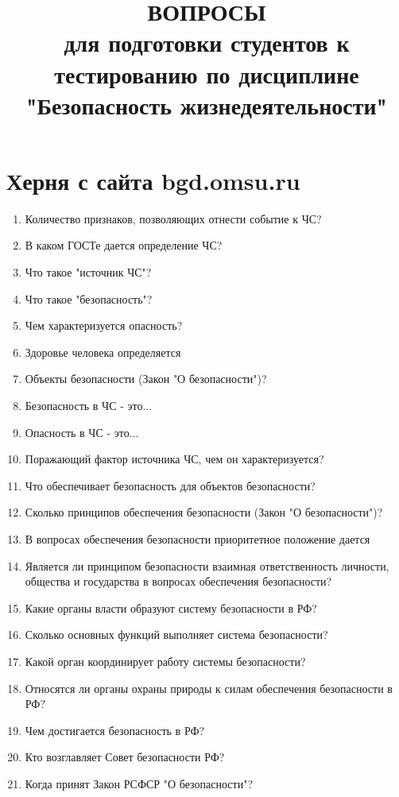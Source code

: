 \documentclass[oneside,final,14pt]{extreport}
\begin{document}
\title{ВОПРОСЫ \\
	для подготовки студентов к тестированию по дисциплине "Безопасность жизнедеятельности"}
\maketitle

\section*{Херня с сайта bgd.omsu.ru}
\begin{enumerate}
	\item Количество признаков, позволяющих отнести событие к ЧС?
	\item В каком ГОСТе дается определение ЧС?
	\item  Что такое "источник ЧС"?
	\item  Что такое "безопасность"?
	\item  Чем характеризуется опасность?
	\item  Здоровье человека определяется
	\item  Объекты безопасности (Закон "О безопасности")?
	\item  Безопасность в ЧС - это...
	\item  Опасность в ЧС - это...
	\item  Поражающий фактор источника ЧС, чем он характеризуется?
	\item  Что обеспечивает безопасность для объектов безопасности?
	\item  Сколько принципов обеспечения безопасности (Закон "О безопасности")?
	\item  В вопросах обеспечения безопасности приоритетное положение дается
	\item  Является ли принципом безопасности взаимная ответственность личности, общества и государства в вопросах обеспечения безопасности?
	\item  Какие органы власти образуют систему безопасности в РФ?
	\item  Сколько основных функций выполняет система безопасности?
	\item  Какой орган координирует работу системы безопасности?
	\item  Относятся ли органы охраны природы к силам обеспечения безопасности в РФ?
	\item  Чем достигается безопасность в РФ?
	\item Кто возглавляет Совет безопасности РФ?
	\item  Когда принят Закон РСФСР "О безопасности"?

\end{enumerate}
\end{document}
